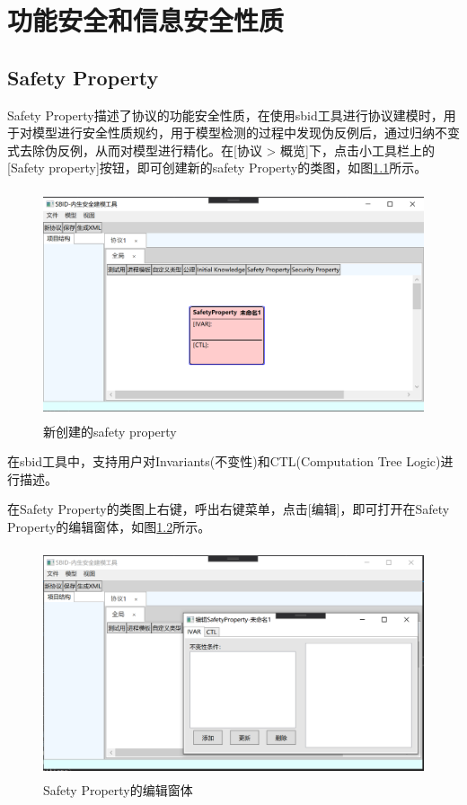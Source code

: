 \chapter{功能安全和信息安全性质}

\section{Safety Property}
Safety Property描述了协议的功能安全性质，在使用sbid工具进行协议建模时，用于对模型进行安全性质规约，用于模型检测的过程中发现伪反例后，通过归纳不变式去除伪反例，从而对模型进行精化。在[协议 > 概览]下，点击小工具栏上的[Safety property]按钮，即可创建新的safety Property的类图，如图\ref{create_safety}所示。
\begin{figure}[h]
	\centering
	\includegraphics[width=12cm,height=6.75cm]{imgs/create_safety.png}
	\caption{新创建的safety property}
	\label{create_safety}
\end{figure}
\par
在sbid工具中，支持用户对Invariants(不变性)和CTL(Computation Tree Logic)进行描述。
\par
在Safety Property的类图上右键，呼出右键菜单，点击[编辑]，即可打开在Safety Property的编辑窗体，如图\ref{safety_edit_window}所示。
\begin{figure}[h]
	\centering
	\includegraphics[width=12cm,height=6.75cm]{imgs/safety_edit_window.png}
	\caption{Safety Property的编辑窗体}
	\label{safety_edit_window}
\end{figure}
\par
